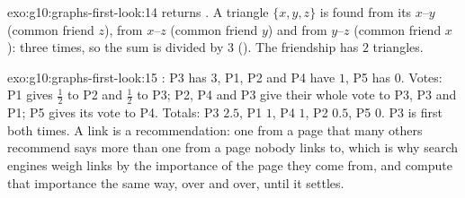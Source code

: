 \begin{solution}{exo:g10:graphs-first-look:14}
 returns . A triangle $\{x, y, z\}$ is found from its  $x$--$y$ (common
friend $z$), from $x$--$z$ (common friend $y$) and from $y$--$z$ (common friend $x$): three times, so the sum is
divided by $3$ (). The friendship  has $2$ triangles.
\end{solution}

\begin{solution}{exo:g10:graphs-first-look:15}
: P3 has $3$, P1, P2 and P4 have $1$, P5 has $0$. Votes: P1 gives $\tfrac12$ to P2 and $\tfrac12$ to P3;
P2, P4 and P3 give their whole vote to P3, P3 and P1; P5 gives its vote to P4. Totals: P3 $2.5$, P1 $1$, P4 $1$,
P2 $0.5$, P5 $0$. P3 is first both times. A link is a recommendation: one from a page that many others recommend
says more than one from a page nobody links to, which is why search engines weigh links by the importance of the page
they come from, and compute that importance the same way, over and over, until it settles.
\end{solution}

